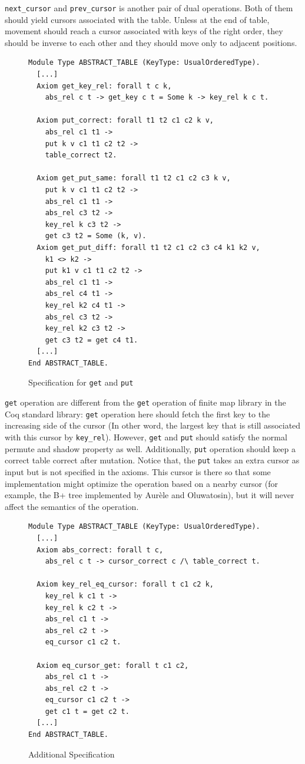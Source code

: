 \documentclass[runningheads]{llncs}
\begin{document}
\texttt{next\_cursor} and \texttt{prev\_cursor} is another pair of dual
operations. Both of them should yield cursors associated with the table. Unless
at the end of table, movement should reach a cursor associated with keys of the
right order, they should be inverse to each other and they should move only to
adjacent positions.

\begin{figure}[htbp]
  \centering
  \begin{verbatim}
Module Type ABSTRACT_TABLE (KeyType: UsualOrderedType).
  [...]
  Axiom get_key_rel: forall t c k,
    abs_rel c t -> get_key c t = Some k -> key_rel k c t.

  Axiom put_correct: forall t1 t2 c1 c2 k v,
    abs_rel c1 t1 ->
    put k v c1 t1 c2 t2 ->
    table_correct t2.

  Axiom get_put_same: forall t1 t2 c1 c2 c3 k v,
    put k v c1 t1 c2 t2 ->
    abs_rel c1 t1 ->
    abs_rel c3 t2 ->
    key_rel k c3 t2 ->
    get c3 t2 = Some (k, v).
  Axiom get_put_diff: forall t1 t2 c1 c2 c3 c4 k1 k2 v,
    k1 <> k2 ->
    put k1 v c1 t1 c2 t2 ->
    abs_rel c1 t1 ->
    abs_rel c4 t1 ->
    key_rel k2 c4 t1 ->
    abs_rel c3 t2 ->
    key_rel k2 c3 t2 ->
    get c3 t2 = get c4 t1.
  [...]
End ABSTRACT_TABLE.
\end{verbatim}
  \caption{Specification for \texttt{get} and \texttt{put}}\label{fig:get_put}
\end{figure}

\texttt{get} operation are different from the \texttt{get} operation of finite
map library in the Coq standard library: \texttt{get} operation here should
fetch the first key to the increasing side of the cursor (In other word, the
largest key that is still associated with this cursor by \texttt{key\_rel}).
However, \texttt{get} and \texttt{put} should satisfy the normal permute and
shadow property as well. Additionally, \texttt{put} operation should keep a
correct table correct after mutation. Notice that, the \texttt{put} takes an
extra cursor as input but is not specified in the axioms. This cursor is there
so that some implementation might optimize the operation based on a nearby
cursor (for example, the B+ tree implemented by Aur\`ele and Oluwatosin), but it
will never affect the semantics of the operation.

\begin{figure}[htbp]
  \centering
  \begin{verbatim}
Module Type ABSTRACT_TABLE (KeyType: UsualOrderedType).
  [...]
  Axiom abs_correct: forall t c,
    abs_rel c t -> cursor_correct c /\ table_correct t.

  Axiom key_rel_eq_cursor: forall t c1 c2 k,
    key_rel k c1 t ->
    key_rel k c2 t ->
    abs_rel c1 t ->
    abs_rel c2 t ->
    eq_cursor c1 c2 t.

  Axiom eq_cursor_get: forall t c1 c2,
    abs_rel c1 t ->
    abs_rel c2 t ->
    eq_cursor c1 c2 t ->
    get c1 t = get c2 t.
  [...]
End ABSTRACT_TABLE.
\end{verbatim}
  \caption{Additional Specification}\label{fig:aux_spec}
\end{figure}
\end{document}
